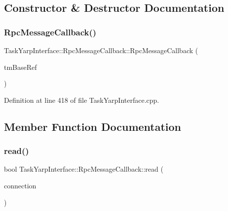 \subsection{Constructor \& Destructor Documentation}
\hypertarget{classocra_1_1TaskYarpInterface_1_1RpcMessageCallback_a2e2770ed9acd291947f2a96fd7bba1d9}{}\label{classocra_1_1TaskYarpInterface_1_1RpcMessageCallback_a2e2770ed9acd291947f2a96fd7bba1d9} 
\subsubsection{\texorpdfstring{Rpc\+Message\+Callback()}{RpcMessageCallback()}}
{\footnotesize\ttfamily Task\+Yarp\+Interface\+::\+Rpc\+Message\+Callback\+::\+Rpc\+Message\+Callback (\begin{DoxyParamCaption}\item[{\hyperlink{classocra_1_1TaskYarpInterface}{Task\+Yarp\+Interface} \&}]{tm\+Base\+Ref }\end{DoxyParamCaption})}



Definition at line 418 of file Task\+Yarp\+Interface.\+cpp.



\subsection{Member Function Documentation}
\hypertarget{classocra_1_1TaskYarpInterface_1_1RpcMessageCallback_a403b0136f2df7ec64af9906560ff113e}{}\label{classocra_1_1TaskYarpInterface_1_1RpcMessageCallback_a403b0136f2df7ec64af9906560ff113e} 
\subsubsection{\texorpdfstring{read()}{read()}}
{\footnotesize\ttfamily bool Task\+Yarp\+Interface\+::\+Rpc\+Message\+Callback\+::read (\begin{DoxyParamCaption}\item[{yarp\+::os\+::\+Connection\+Reader \&}]{connection }\end{DoxyParamCaption})\hspace{0.3cm}{\ttfamily [virtual]}}



